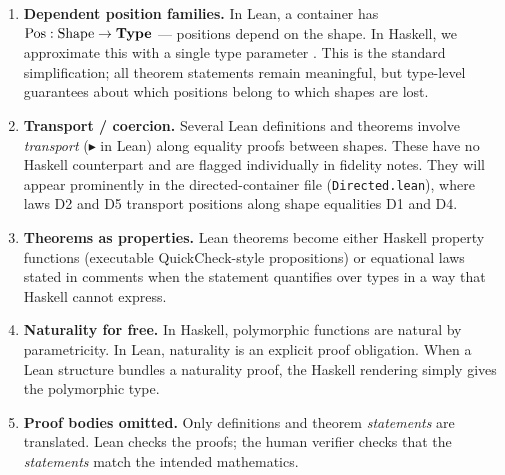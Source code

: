 \documentclass[11pt,a4paper]{article}
\begin{document}
\begin{enumerate}
\item \textbf{Dependent position families.}  In Lean, a container has
  $\mathrm{Pos} : \mathrm{Shape} \to \mathbf{Type}$ --- positions depend on the shape.
  In Haskell, we approximate this with a single type parameter .
  This is the standard simplification; all theorem statements remain
  meaningful, but type-level guarantees about which positions belong to which
  shapes are lost.

\item \textbf{Transport / coercion.}  Several Lean definitions and theorems
  involve \emph{transport} ($\blacktriangleright$ in Lean) along equality
  proofs between shapes.  These have no Haskell counterpart and are flagged
  individually in fidelity notes.  They will appear prominently in the
  directed-container file (\texttt{Directed.lean}), where laws D2 and D5
  transport positions along shape equalities D1 and D4.

\item \textbf{Theorems as properties.}  Lean theorems become either
  Haskell property functions (executable QuickCheck-style propositions) or
  equational laws stated in comments when the statement quantifies over types
  in a way that Haskell cannot express.

\item \textbf{Naturality for free.}  In Haskell, polymorphic functions are
  natural by parametricity.  In Lean, naturality is an explicit proof
  obligation.  When a Lean structure bundles a naturality proof, the Haskell
  rendering simply gives the polymorphic type.

\item \textbf{Proof bodies omitted.}  Only definitions and theorem
  \emph{statements} are translated.  Lean checks the proofs; the human
  verifier checks that the \emph{statements} match the intended mathematics.
\end{enumerate}
\end{document}
